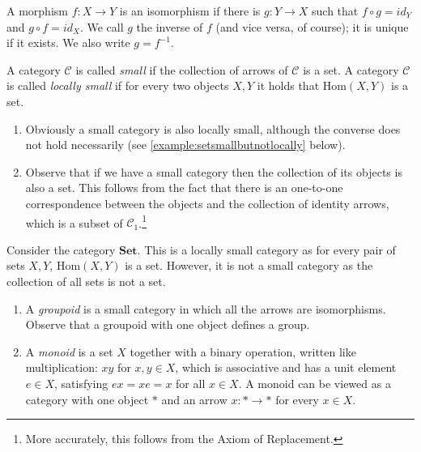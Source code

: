 \documentclass[11pt]{article}
\theoremstyle{plain}
\theoremstyle{definition}
\theoremstyle{remark}
\newcommand{\cC}{\mathcal{C}}
\newcommand{\Hom}{\mathrm{Hom}}
\begin{document}
\begin{definition}[Isomorphism]
A morphism $f:X\rightarrow Y$ is an isomorphism if there is $g:Y \rightarrow X$
such that $f\circ g= id_{Y}$ and $g \circ f= id_{X}$. We call $g$ the inverse of
$f$ (and vice versa, of course); it is unique if it exists. We also write
$g=f^{-1}$.
\end{definition}

\begin{definition}
A category $\cC$ is called {\em small} if the collection of arrows of $\cC$ is
a set. A category $\cC$ is called {\em locally small} if for every two objects
$X,Y$ it holds that $\Hom(X,Y)$ is a set.
\end{definition}

\begin{remarks}
\begin{enumerate}
    \item Obviously a small category is also locally small, although the 
    converse does not hold necessarily
    (see \autoref{example:setsmallbutnotlocally} below).
    
    \item Observe that if we have a small category then the collection of its
    objects is also a set. This follows from the fact that there is an
    one-to-one correspondence between the objects and the collection of identity
    arrows, which is a subset of $\cC_{1}$.\footnote{More accurately, this
    follows from the Axiom of Replacement.}
\end{enumerate}
\end{remarks}

\begin{example}\label{example:setsmallbutnotlocally}
Consider the category $\textbf{Set}$. This is a locally small category as
for every pair of sets $X,Y$, $\Hom(X,Y)$ is a set.
However, it is not a small category as the collection of all sets
is not a set.
\end{example}
\begin{examples}
\begin{enumerate}
    \item A {\em groupoid} is a small category in which all the arrows
    are isomorphisms. Observe that a groupoid with one object defines a
    group.
    
    \item Α {\em monoid} is a set $X$ together with a binary operation,
    written like multiplication: $xy$ for $x,y \in X$, which is associative
    and has
    a unit element $e \in X$, satisfying $ex=xe=x$ for all $x \in X$. 
    A monoid can be viewed as a category with one object $*$ and an arrow
    $x:*\to *$ for every $x \in X$.
\end{enumerate}
\end{examples}
\end{document}
